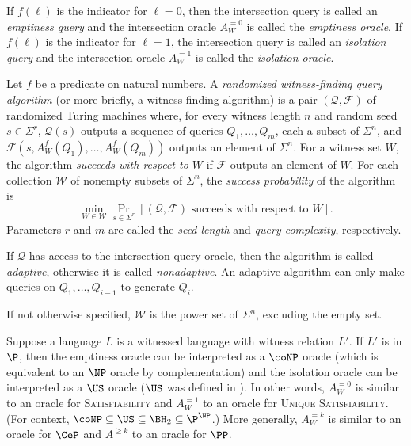 \documentclass{article}
\newcommand{\mc}{\mathcal}
\begin{document}
If $f(\ell)$ is the indicator for $\ell = 0$, then the intersection query is called an \emph{emptiness query} and the intersection oracle $A^{=0}_W$ is called the \emph{emptiness oracle}.
If $f(\ell)$ is the indicator for $\ell = 1$, the intersection query is called an \emph{isolation query} and the intersection oracle $A^{=1}_W$ is called the \emph{isolation oracle}.

\begin{definition}
  Let $f$ be a predicate on natural numbers.
  A \emph{randomized witness-finding query algorithm} (or more briefly, a witness-finding algorithm) is a pair $(\mc{Q}, \mc{F})$ of randomized Turing machines where, for every witness length $n$ and random seed $s \in \Sigma^r$, $\mc{Q}(s)$ outputs a sequence of queries $Q_1, \dotsc, Q_m$, each a subset of $\Sigma^n$, and $\mc{F}(s, A^f_W(Q_1), \dotsc, A^f_W(Q_m))$ outputs an element of $\Sigma^n$.
  For a witness set $W$, the algorithm \emph{succeeds with respect to $W$} if $\mc{F}$ outputs an element of $W$.
  For each collection $\mc{W}$ of nonempty subsets of $\Sigma^n$, the \emph{success probability} of the algorithm is
  \begin{equation*}
    \min_{W \in \mc{W}} \Pr_{s \in \Sigma^r} [(\mc{Q}, \mc{F}) \text{ succeeds with respect to } W].
  \end{equation*}
  Parameters $r$ and $m$ are called the \emph{seed length} and \emph{query complexity}, respectively.

  If $\mc{Q}$ has access to the intersection query oracle, then the algorithm is called \emph{adaptive}, otherwise it is called \emph{nonadaptive}.
  An adaptive algorithm can only make queries on $Q_1, \dotsc, Q_{i - 1}$ to generate $Q_i$.
\end{definition}

If not otherwise specified, $\mc{W}$ is the power set of $\Sigma^n$, excluding the empty set.

Suppose a language $L$ is a witnessed language with witness relation $L'$.
If $L'$ is in $\P$, then the emptiness oracle can be interpreted as a $\coNP$ oracle (which is equivalent to an $\NP$ oracle by complementation) and the isolation oracle can be interpreted as a $\US$ oracle ($\US$ was defined in \autocite{bg82}).
In other words, $A^{=0}_W$ is similar to an oracle for \textsc{Satisfiability} and $A^{=1}_W$ to an oracle for \textsc{Unique Satisfiability}.
(For context, $\coNP \subseteq \US \subseteq \BH_2 \subseteq \P^\NP$.)
More generally, $A^{= k}_W$ is similar to an oracle for $\CeP$ and $A^{\geq k}$ to an oracle for $\PP$.
\end{document}
